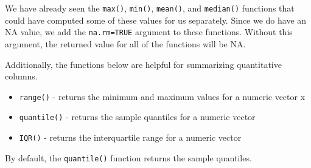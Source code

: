 \documentclass[
  letterpaper,
]{krantz}
\makeatletter
\newenvironment{Shaded}{\begin{snugshade}}{\end{snugshade}}
\newcommand{\AttributeTok}[1]{\textcolor[rgb]{0.40,0.45,0.13}{#1}}
\newcommand{\CommentTok}[1]{\textcolor[rgb]{0.37,0.37,0.37}{#1}}
\newcommand{\ConstantTok}[1]{\textcolor[rgb]{0.56,0.35,0.01}{#1}}
\newcommand{\FunctionTok}[1]{\textcolor[rgb]{0.28,0.35,0.67}{#1}}
\newcommand{\NormalTok}[1]{\textcolor[rgb]{0.00,0.23,0.31}{#1}}
\newcommand{\SpecialCharTok}[1]{\textcolor[rgb]{0.37,0.37,0.37}{#1}}
\providecommand{\tightlist}{%
  \setlength{\itemsep}{0pt}\setlength{\parskip}{0pt}}\usepackage{longtable,booktabs,array}
\newenvironment{kframe}{%
\medskip{}
\setlength{\fboxsep}{.8em}
 \def\at@end@of@kframe{}%
 \ifinner\ifhmode%
  \def\at@end@of@kframe{\end{minipage}}%
  \begin{minipage}{\columnwidth}%
 \fi\fi%
 \def\FrameCommand##1{\hskip\@totalleftmargin \hskip-\fboxsep
 \colorbox{shadecolor}{##1}\hskip-\fboxsep
     \hskip-\linewidth \hskip-\@totalleftmargin \hskip\columnwidth}%
 \MakeFramed {\advance\hsize-\width
   \@totalleftmargin\z@ \linewidth\hsize
   \@setminipage}}%
 {\par\unskip\endMakeFramed%
 \at@end@of@kframe}
\renewenvironment{Shaded}{\begin{kframe}}{\end{kframe}}
\makeatother
\begin{document}
\begin{Shaded}
\end{Shaded}

We have already seen the \texttt{max()}, \texttt{min()},
\texttt{mean()}, and \texttt{median()} functions that could have
computed some of these values for us separately. Since we do have an NA
value, we add the \texttt{na.rm=TRUE} argument to these functions.
Without this argument, the returned value for all of the functions will
be NA.

\begin{Shaded}
\end{Shaded}

Additionally, the functions below are helpful for summarizing
quantitative columns.

\begin{itemize}
\tightlist
\item
  \texttt{range()} - returns the minimum and maximum values for a
  numeric vector x
\item
  \texttt{quantile()} - returns the sample quantiles for a numeric
  vector
\item
  \texttt{IQR()} - returns the interquartile range for a numeric vector
\end{itemize}

By default, the \texttt{quantile()} function returns the sample
quantiles.
\end{document}
